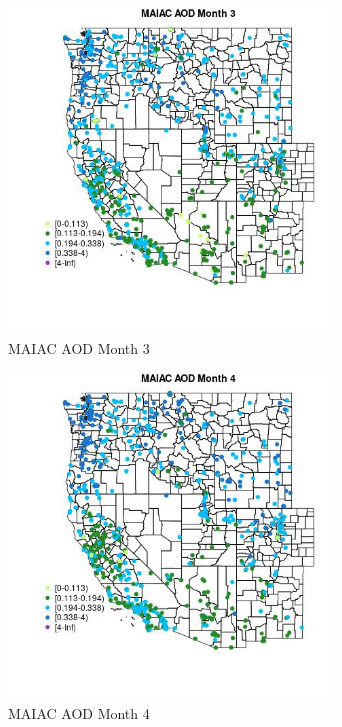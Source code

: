 \begin{figure} 
\centering  
\includegraphics[width=0.77\textwidth]{Code_Outputs/Report_ML_input_PM25_Step4_part_f_de_duplicated_aves_prioritize_24hr_obswNAs_MapObsMo3MAIAC_AOD.jpg} 
\caption{\label{fig:Report_ML_input_PM25_Step4_part_f_de_duplicated_aves_prioritize_24hr_obswNAsMapObsMo3MAIAC_AOD}MAIAC AOD Month 3} 
\end{figure} 
 

\begin{figure} 
\centering  
\includegraphics[width=0.77\textwidth]{Code_Outputs/Report_ML_input_PM25_Step4_part_f_de_duplicated_aves_prioritize_24hr_obswNAs_MapObsMo4MAIAC_AOD.jpg} 
\caption{\label{fig:Report_ML_input_PM25_Step4_part_f_de_duplicated_aves_prioritize_24hr_obswNAsMapObsMo4MAIAC_AOD}MAIAC AOD Month 4} 
\end{figure} 
 

